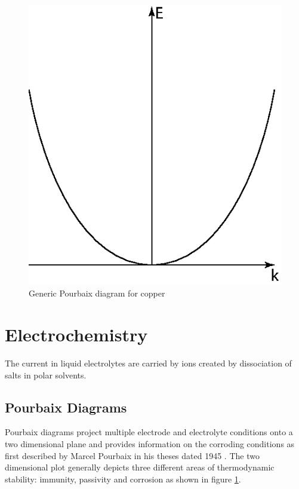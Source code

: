 {%
	\begin{figure}
		\centering
		\includegraphics[scale=1]{Figures/Parabolic_energy.eps}
		\caption{Generic Pourbaix diagram for copper}
		\label{fig:pourbaix_generic}
	\end{figure}

\section{Electrochemistry}
The current in liquid electrolytes are carried by ions created by dissociation of salts in polar solvents. 

\newpage

\subsection{Pourbaix Diagrams}

Pourbaix diagrams project multiple electrode and electrolyte conditions onto a two dimensional plane and provides information on the corroding conditions as first described by Marcel Pourbaix in his theses dated 1945 \citep{Pourbaix1945}. The two dimensional plot generally depicts three different areas of thermodynamic stability: immunity, passivity and corrosion  as shown in figure \ref{fig:pourbaix_generic}.

}
